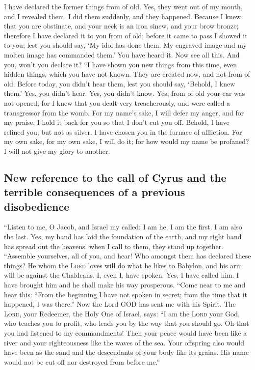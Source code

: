  I have declared the former things from of old. Yes, they
went out of my mouth, and I revealed them. I did them suddenly, and they
happened.  Because I knew that you are obstinate, and your
neck is an iron sinew, and your brow bronze;  therefore I
have declared it to you from of old; before it came to pass I showed it
to you; lest you should say, `My idol has done them. My engraved image
and my molten image has commanded them.'  You have heard
it. Now see all this. And you, won't you declare it? ``I have shown you
new things from this time, even hidden things, which you have not known.
 They are created now, and not from of old. Before today,
you didn't hear them, lest you should say, `Behold, I knew them.'
 Yes, you didn't hear. Yes, you didn't know. Yes, from of
old your ear was not opened, for I knew that you dealt very
treacherously, and were called a transgressor from the womb.
 For my name's sake, I will defer my anger, and for my
praise, I hold it back for you so that I don't cut you off.
 Behold, I have refined you, but not as silver. I have
chosen you in the furnace of affliction.  For my own
sake, for my own sake, I will do it; for how would my name be profaned?
I will not give my glory to another.

\hypertarget{new-reference-to-the-call-of-cyrus-and-the-terrible-consequences-of-a-previous-disobedience}{%
\subsection{New reference to the call of Cyrus and the terrible
consequences of a previous
disobedience}\label{new-reference-to-the-call-of-cyrus-and-the-terrible-consequences-of-a-previous-disobedience}}

 ``Listen to me, O Jacob, and Israel my called: I am he.
I am the first. I am also the last.  Yes, my hand has
laid the foundation of the earth, and my right hand has spread out the
heavens. when I call to them, they stand up together. 
``Assemble yourselves, all of you, and hear! Who amongst them has
declared these things? He whom the \textsc{Lord} loves will do what he
likes to Babylon, and his arm will be against the Chaldeans.
 I, even I, have spoken. Yes, I have called him. I have
brought him and he shall make his way prosperous.  ``Come
near to me and hear this: ``From the beginning I have not spoken in
secret; from the time that it happened, I was there.'' Now the Lord GOD
has sent me with his Spirit.  The \textsc{Lord}, your
Redeemer, the Holy One of Israel, says: ``I am the \textsc{Lord} your
God, who teaches you to profit, who leads you by the way that you should
go.  Oh that you had listened to my commandments! Then
your peace would have been like a river and your righteousness like the
waves of the sea.  Your offspring also would have been as
the sand and the descendants of your body like its grains. His name
would not be cut off nor destroyed from before me.''

